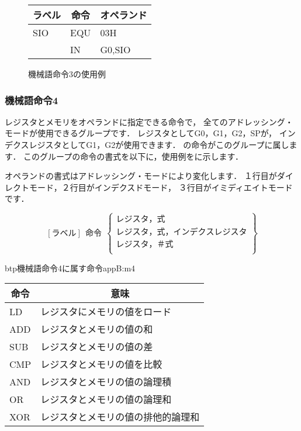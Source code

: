 \begin{figure}[btp]
\begin{center}
{\tt\small\begin{tabular}{|l|l|l|}\hline
\multicolumn{1}{|c|}{ラベル} & 
        \multicolumn{1}{c|}{命令} & \multicolumn{1}{c|}{オペランド} \\\hline
SIO  & EQU &  03H \\
     & IN  &  G0,SIO \\\hline
\end{tabular}}
\caption{機械語命令3の使用例}
\label{fig:appB:m3ex}
\end{center}
\end{figure}

\subsubsection{機械語命令4}
レジスタとメモリをオペランドに指定できる命令で，
全てのアドレッシング・モードが使用できるグループです．
レジスタとしてG0，G1，G2，SPが，
インデクスレジスタとしてG1，G2が使用できます．
の命令がこのグループに属します．
このグループの命令の書式を以下に，使用例をに示します．

オペランドの書式はアドレッシング・モードにより変化します．
１行目がダイレクトモード，２行目がインデクスドモード，
３行目がイミディエイトモードです．

{\small\[ %
[ラベル]~~命令~~\left\{
  \begin{array}{c}
   レジスタ，式 \\
   レジスタ，式，インデクスレジスタ \\
   レジスタ，＃式 \\
  \end{array}  
 \right\}
 \]}

\begin{mytable}{btp}{機械語命令4に属す命令}{appB:m4}
{\small\begin{tabular}{l|l}
\hline\hline
\multicolumn{1}{c|}{命令} & \multicolumn{1}{c}{意味} \\\hline
LD & レジスタにメモリの値をロード \\
ADD & レジスタとメモリの値の和 \\
SUB & レジスタとメモリの値の差 \\
CMP & レジスタとメモリの値を比較 \\
AND & レジスタとメモリの値の論理積 \\
OR & レジスタとメモリの値の論理和 \\
XOR & レジスタとメモリの値の排他的論理和
\end{tabular}}
\end{mytable}

